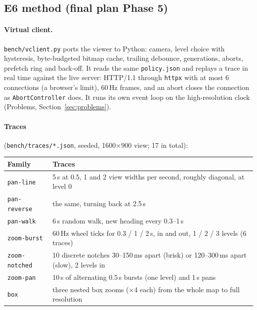 ﻿\documentclass[11pt,a4paper]{article}
\newcommand{\code}[1]{\texttt{#1}}
\begin{document}
\subsection{E6 method (final plan Phase 5)}\label{sec:e6method}
\paragraph{Virtual client.} \code{bench/vclient.py} ports the viewer to Python: camera, level choice with hysteresis,
byte-budgeted bitmap cache, trailing debounce, generations, aborts, prefetch ring and back-off. It reads the same
\code{policy.json} and replays a trace in real time against the live server: HTTP/1.1 through \code{httpx} with at most 6
connections (a browser's limit), 60\,Hz frames, and an abort closes the connection as \code{AbortController} does.
It runs its own event loop on the high-resolution clock (Problems, Section~\ref{sec:problems}).

\paragraph{Traces} (\code{bench/traces/*.json}, seeded, 1600$\times$900 view; 17 in total):
\begin{center}\small
\begin{tabularx}{\linewidth}{>{\raggedright\arraybackslash}p{3.0cm}L}
\toprule
Family & Traces \\
\midrule
\code{pan-line} & 5\,s at 0.5, 1 and 2 view widths per second, roughly diagonal, at level 0 \\
\code{pan-reverse} & the same, turning back at 2.5\,s \\
\code{pan-walk} & 6\,s random walk, new heading every 0.3--1\,s \\
\code{zoom-burst} & 60\,Hz wheel ticks for 0.3 / 1 / 2\,s, in and out, 1 / 2 / 3 levels (6 traces) \\
\code{zoom-notched} & 10 discrete notches 30--150\,ms apart (brisk) or 120--300\,ms apart (slow), 2 levels in \\
\code{zoom-pan} & 10\,s of alternating 0.5\,s bursts (one level) and 1\,s pans \\
\code{box} & three nested box zooms ($\times$4 each) from the whole map to full resolution \\
\bottomrule
\end{tabularx}
\end{center}
\end{document}
